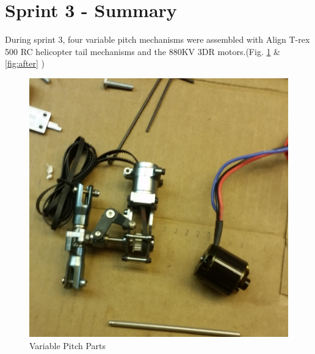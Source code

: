 \section{Sprint 3 - Summary}

During sprint 3, four variable pitch mechanisms were assembled with Align T-rex 500 RC helicopter tail mechanisms and the 880KV 3DR motors.(Fig. \ref{fig:before} \& \ref{fig:after} )

\begin{figure}[h]
        \centering
         \begin{minipage}[b]{0.4\textwidth}
            \includegraphics[width = 1\textwidth]{VAPIQ-PICTURES/BeforeAssembly.jpg}
              \caption{Variable Pitch Parts}
            \label{fig:before}
        \end{minipage}
        \hfill
        \begin{minipage}[b]{0.4\textwidth}

\end{minipage}
\end{figure}

